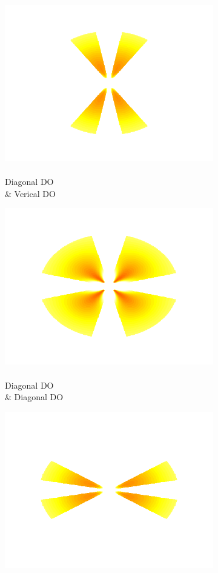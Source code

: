\documentclass[journal,onecolumn]{IEEEtran}
\begin{document}
\begin{figure}[h]
\begin{subfigure}[b]{0.2\textwidth}
            \includegraphics[width=.85\linewidth]{map-j_2_1}
            \caption{\\ Diagonal DO \\ \& Verical DO}
    \end{subfigure}%
    \begin{subfigure}[b]{0.2\textwidth}
            \centering
            \captionsetup{justification=centering}
            \includegraphics[width=.85\linewidth]{map-j_2_2}
            \caption{\\ Diagonal DO \\ \& Diagonal DO}
    \end{subfigure}%
    \begin{subfigure}[b]{0.2\textwidth}
            \centering
            \captionsetup{justification=centering}
            \includegraphics[width=.85\linewidth]{map-j_2_3}

\end{subfigure}
\end{figure}
\end{document}
